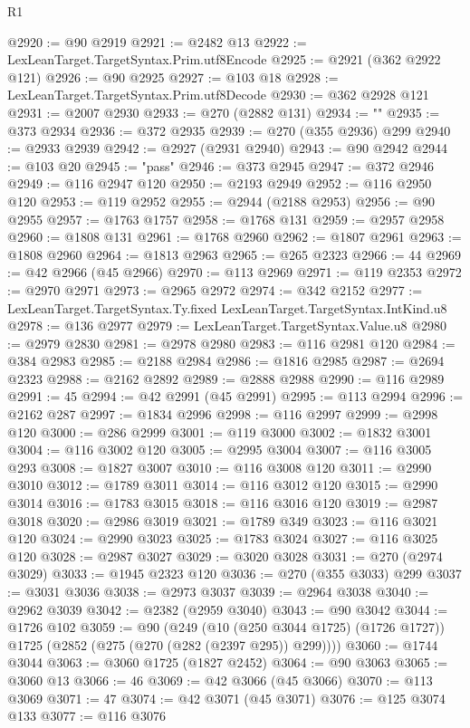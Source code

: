 \begin{lexlean}{R1}
\begin{coremodule}
@2920 := @90 @2919
@2921 := @2482 @13
@2922 := LexLeanTarget.TargetSyntax.Prim.utf8Encode
@2925 := @2921 (@362 @2922 @121)
@2926 := @90 @2925
@2927 := @103 @18
@2928 := LexLeanTarget.TargetSyntax.Prim.utf8Decode
@2930 := @362 @2928 @121
@2931 := @2007 @2930
@2933 := @270 (@2882 @131)
@2934 := ""
@2935 := @373 @2934
@2936 := @372 @2935
@2939 := @270 (@355 @2936) @299
@2940 := @2933 @2939
@2942 := @2927 (@2931 @2940)
@2943 := @90 @2942
@2944 := @103 @20
@2945 := "pass"
@2946 := @373 @2945
@2947 := @372 @2946
@2949 := @116 @2947 @120
@2950 := @2193 @2949
@2952 := @116 @2950 @120
@2953 := @119 @2952
@2955 := @2944 (@2188 @2953)
@2956 := @90 @2955
@2957 := @1763 @1757
@2958 := @1768 @131
@2959 := @2957 @2958
@2960 := @1808 @131
@2961 := @1768 @2960
@2962 := @1807 @2961
@2963 := @1808 @2960
@2964 := @1813 @2963
@2965 := @265 @2323
@2966 := 44
@2969 := @42 @2966 (@45 @2966)
@2970 := @113 @2969
@2971 := @119 @2353
@2972 := @2970 @2971
@2973 := @2965 @2972
@2974 := @342 @2152
@2977 := LexLeanTarget.TargetSyntax.Ty.fixed LexLeanTarget.TargetSyntax.IntKind.u8
@2978 := @136 @2977
@2979 := LexLeanTarget.TargetSyntax.Value.u8
@2980 := @2979 @2830
@2981 := @2978 @2980
@2983 := @116 @2981 @120
@2984 := @384 @2983
@2985 := @2188 @2984
@2986 := @1816 @2985
@2987 := @2694 @2323
@2988 := @2162 @2892
@2989 := @2888 @2988
@2990 := @116 @2989
@2991 := 45
@2994 := @42 @2991 (@45 @2991)
@2995 := @113 @2994
@2996 := @2162 @287
@2997 := @1834 @2996
@2998 := @116 @2997
@2999 := @2998 @120
@3000 := @286 @2999
@3001 := @119 @3000
@3002 := @1832 @3001
@3004 := @116 @3002 @120
@3005 := @2995 @3004
@3007 := @116 @3005 @293
@3008 := @1827 @3007
@3010 := @116 @3008 @120
@3011 := @2990 @3010
@3012 := @1789 @3011
@3014 := @116 @3012 @120
@3015 := @2990 @3014
@3016 := @1783 @3015
@3018 := @116 @3016 @120
@3019 := @2987 @3018
@3020 := @2986 @3019
@3021 := @1789 @349
@3023 := @116 @3021 @120
@3024 := @2990 @3023
@3025 := @1783 @3024
@3027 := @116 @3025 @120
@3028 := @2987 @3027
@3029 := @3020 @3028
@3031 := @270 (@2974 @3029)
@3033 := @1945 @2323 @120
@3036 := @270 (@355 @3033) @299
@3037 := @3031 @3036
@3038 := @2973 @3037
@3039 := @2964 @3038
@3040 := @2962 @3039
@3042 := @2382 (@2959 @3040)
@3043 := @90 @3042
@3044 := @1726 @102
@3059 := @90
    (@249
      (@10 (@250 @3044 @1725) (@1726 @1727))
      @1725
      (@2852 (@275 (@270 (@282 (@2397 @295)) @299))))
@3060 := @1744 @3044
@3063 := @3060 @1725 (@1827 @2452)
@3064 := @90 @3063
@3065 := @3060 @13
@3066 := 46
@3069 := @42 @3066 (@45 @3066)
@3070 := @113 @3069
@3071 := 47
@3074 := @42 @3071 (@45 @3071)
@3076 := @125 @3074 @133
@3077 := @116 @3076

\end{coremodule}
\end{lexlean}
